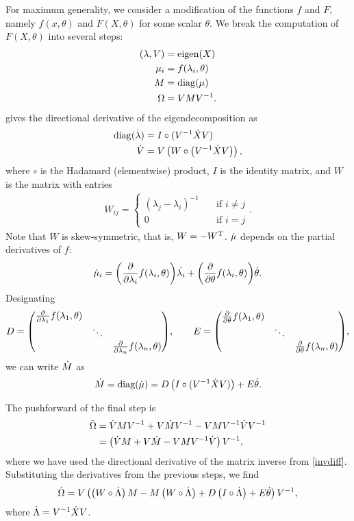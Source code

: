 \documentclass[../../main.tex]{subfiles}
\begin{document}
\begin{refsection}
	For maximum generality, we consider a modification of the functions $f$ and $F$, namely $f(x, \theta)$ and $F(X, \theta)$ for some scalar $\theta$.
	We break the computation of $F(X, \theta)$ into several steps:
	\begin{align*}
		(\lambda, V) & = \operatorname{eigen}(X) \\
		\mu_i        & = f(\lambda_i, \theta)    \\
		M            & = \operatorname{diag}(\mu)              \\
		\Omega       & = V M V^{-1}.
	\end{align*}
	\cite[Section 3.1]{gilesExtendedCollectionMatrix2008} gives the directional derivative of the eigendecomposition as
	\begin{align*}
		\operatorname{diag}(\dot{\lambda}) & = I \circ (V^{-1} \dot{X} V)                              \\
		\dot{V}              & = V \left(W \circ \left(V^{-1} \dot{X} V \right) \right),
	\end{align*}
	where $\circ$ is the Hadamard (elementwise) product, $I$ is the identity matrix, and $W$ is the matrix with entries
	\begin{align*}
		W_{ij} = \begin{cases}
			(\lambda_j - \lambda_i)^{-1} \quad & \text{if } i \ne j \\
			0 \quad                            & \text{if } i = j
		\end{cases}.
	\end{align*}
	Note that $W$ is skew-symmetric, that is, $W = -{W}^\mathrm{T}$.
	$\dot{\mu}$ depends on the partial derivatives of $f$:
	\[\dot{\mu}_i = \qty(\pdv{\lambda_i} f(\lambda_i, \theta)) \dot{\lambda_i} + \qty(\pdv{\theta} f(\lambda_i, \theta)) \dot{\theta}.\]
	Designating
	$$D = \mqty(\dmat{{\pdv{\lambda_1} f(\lambda_1, \theta)}, \ddots, {\pdv{\lambda_n} f(\lambda_n, \theta)}}), \qquad E = \mqty(\dmat{{\pdv{\theta} f(\lambda_1, \theta)}, \ddots, {\pdv{\theta} f(\lambda_n, \theta)}}),$$
	we can write $\dot{M}$ as
	\[\dot{M} = \operatorname{diag}(\dot{\mu}) = D \left(I \circ (V^{-1} \dot{X} V)\right) + E \dot{\theta}.\]

	The pushforward of the final step is
	\begin{align*}
		\dot{\Omega}
		 & = \dot{V} M V^{-1} + V \dot{M} V^{-1} - V M V^{-1} \dot{V} V^{-1}   \\
		 & = \left( \dot{V} M + V \dot{M} - V M V^{-1} \dot{V} \right) V^{-1},
	\end{align*}
	where we have used the directional derivative of the matrix inverse from \cref{invdiff}.
	Substituting the derivatives from the previous steps, we find
	\begin{equation*}
		\dot{\Omega}
		= V \left(\left(W \circ \dot{\Lambda} \right) M -
		M \left(W \circ \dot{\Lambda} \right) +
		D \left(I \circ \dot{\Lambda} \right) +
		E \dot{\theta}
		\right) V^{-1},
	\end{equation*}
	where $\dot{\Lambda} = V^{-1} \dot{X} V$.


\end{refsection}
\end{document}
